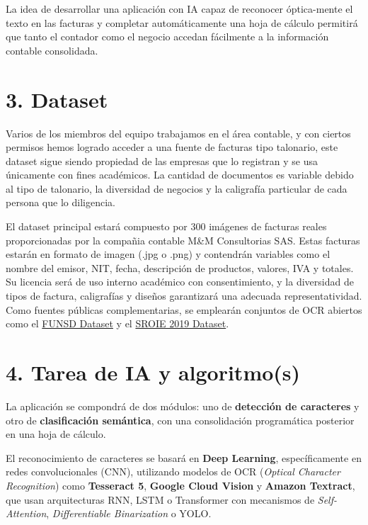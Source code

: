 \documentclass[12pt,a4paper]{article}
\begin{document}
La idea de desarrollar una aplicación con IA capaz de reconocer óptica-mente el texto en las facturas y completar automáticamente una hoja de cálculo permitirá que tanto el contador como el negocio accedan fácilmente a la información contable consolidada.

\section*{3. Dataset}

Varios de los miembros del equipo trabajamos en el área contable, y con ciertos permisos hemos logrado acceder a una fuente de facturas tipo talonario, este dataset sigue siendo propiedad de las empresas que lo registran y se usa únicamente con fines académicos. La cantidad de documentos es variable debido al tipo de talonario, la diversidad de negocios y la caligrafía particular de cada persona que lo diligencia.

El dataset principal estará compuesto por 300 imágenes de facturas reales proporcionadas por la compañia contable M\&M Consultorias SAS. Estas facturas estarán en formato de imagen (.jpg o .png) y contendrán variables como el nombre del emisor, NIT, fecha, descripción de productos, valores, IVA y totales. Su licencia será de uso interno académico con consentimiento, y la diversidad de tipos de factura, caligrafías y diseños garantizará una adecuada representatividad. Como fuentes públicas complementarias, se emplearán conjuntos de OCR abiertos como el \href{https://guillaumejaume.github.io/FUNSD/}{FUNSD Dataset} y el \href{https://rrc.cvc.uab.es/?ch=13}{SROIE 2019 Dataset}.


\section*{4. Tarea de IA y algoritmo(s)}

La aplicación se compondrá de dos módulos: uno de \textbf{detección de caracteres} y otro de \textbf{clasificación semántica}, con una consolidación programática posterior en una hoja de cálculo.

El reconocimiento de caracteres se basará en \textbf{Deep Learning}, específicamente en redes convolucionales (CNN), utilizando modelos de OCR (\textit{Optical Character Recognition}) como \textbf{Tesseract 5}, \textbf{Google Cloud Vision} y \textbf{Amazon Textract}, que usan arquitecturas RNN, LSTM o Transformer con mecanismos de \textit{Self-Attention}, \textit{Differentiable Binarization} o YOLO. 
\end{document}
